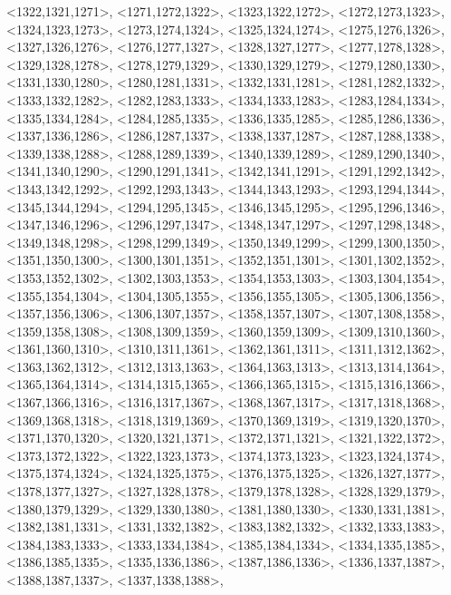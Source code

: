 \documentclass[a4paper,10pt]{article}
\begin{document}
\begin{eulernotebook}
\begin{euleroutput}
  <1322,1321,1271>,
  <1271,1272,1322>,
  <1323,1322,1272>,
  <1272,1273,1323>,
  <1324,1323,1273>,
  <1273,1274,1324>,
  <1325,1324,1274>,
  <1275,1276,1326>,
  <1327,1326,1276>,
  <1276,1277,1327>,
  <1328,1327,1277>,
  <1277,1278,1328>,
  <1329,1328,1278>,
  <1278,1279,1329>,
  <1330,1329,1279>,
  <1279,1280,1330>,
  <1331,1330,1280>,
  <1280,1281,1331>,
  <1332,1331,1281>,
  <1281,1282,1332>,
  <1333,1332,1282>,
  <1282,1283,1333>,
  <1334,1333,1283>,
  <1283,1284,1334>,
  <1335,1334,1284>,
  <1284,1285,1335>,
  <1336,1335,1285>,
  <1285,1286,1336>,
  <1337,1336,1286>,
  <1286,1287,1337>,
  <1338,1337,1287>,
  <1287,1288,1338>,
  <1339,1338,1288>,
  <1288,1289,1339>,
  <1340,1339,1289>,
  <1289,1290,1340>,
  <1341,1340,1290>,
  <1290,1291,1341>,
  <1342,1341,1291>,
  <1291,1292,1342>,
  <1343,1342,1292>,
  <1292,1293,1343>,
  <1344,1343,1293>,
  <1293,1294,1344>,
  <1345,1344,1294>,
  <1294,1295,1345>,
  <1346,1345,1295>,
  <1295,1296,1346>,
  <1347,1346,1296>,
  <1296,1297,1347>,
  <1348,1347,1297>,
  <1297,1298,1348>,
  <1349,1348,1298>,
  <1298,1299,1349>,
  <1350,1349,1299>,
  <1299,1300,1350>,
  <1351,1350,1300>,
  <1300,1301,1351>,
  <1352,1351,1301>,
  <1301,1302,1352>,
  <1353,1352,1302>,
  <1302,1303,1353>,
  <1354,1353,1303>,
  <1303,1304,1354>,
  <1355,1354,1304>,
  <1304,1305,1355>,
  <1356,1355,1305>,
  <1305,1306,1356>,
  <1357,1356,1306>,
  <1306,1307,1357>,
  <1358,1357,1307>,
  <1307,1308,1358>,
  <1359,1358,1308>,
  <1308,1309,1359>,
  <1360,1359,1309>,
  <1309,1310,1360>,
  <1361,1360,1310>,
  <1310,1311,1361>,
  <1362,1361,1311>,
  <1311,1312,1362>,
  <1363,1362,1312>,
  <1312,1313,1363>,
  <1364,1363,1313>,
  <1313,1314,1364>,
  <1365,1364,1314>,
  <1314,1315,1365>,
  <1366,1365,1315>,
  <1315,1316,1366>,
  <1367,1366,1316>,
  <1316,1317,1367>,
  <1368,1367,1317>,
  <1317,1318,1368>,
  <1369,1368,1318>,
  <1318,1319,1369>,
  <1370,1369,1319>,
  <1319,1320,1370>,
  <1371,1370,1320>,
  <1320,1321,1371>,
  <1372,1371,1321>,
  <1321,1322,1372>,
  <1373,1372,1322>,
  <1322,1323,1373>,
  <1374,1373,1323>,
  <1323,1324,1374>,
  <1375,1374,1324>,
  <1324,1325,1375>,
  <1376,1375,1325>,
  <1326,1327,1377>,
  <1378,1377,1327>,
  <1327,1328,1378>,
  <1379,1378,1328>,
  <1328,1329,1379>,
  <1380,1379,1329>,
  <1329,1330,1380>,
  <1381,1380,1330>,
  <1330,1331,1381>,
  <1382,1381,1331>,
  <1331,1332,1382>,
  <1383,1382,1332>,
  <1332,1333,1383>,
  <1384,1383,1333>,
  <1333,1334,1384>,
  <1385,1384,1334>,
  <1334,1335,1385>,
  <1386,1385,1335>,
  <1335,1336,1386>,
  <1387,1386,1336>,
  <1336,1337,1387>,
  <1388,1387,1337>,
  <1337,1338,1388>,

\end{euleroutput}
\end{eulernotebook}
\end{document}
